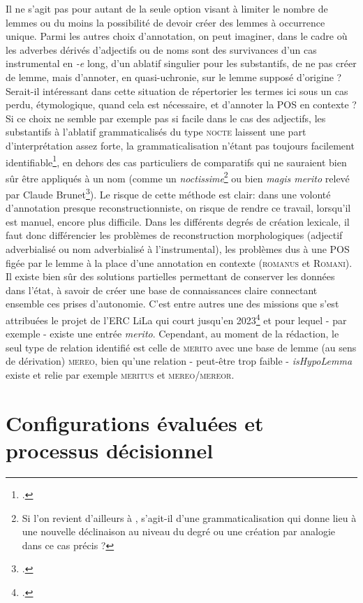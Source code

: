 Il ne s'agit pas pour autant de la seule option visant à limiter le nombre de lemmes ou du moins la possibilité de devoir créer des lemmes à occurrence unique. Parmi les autres choix d'annotation, on peut imaginer, dans le cadre où les adverbes dérivés d'adjectifs ou de noms sont des survivances d'un cas instrumental en \textit{-e} long, d'un ablatif singulier pour les substantifs, de ne pas créer de lemme, mais d'annoter, en quasi-uchronie, sur le lemme supposé d'origine ? Serait-il intéressant dans cette situation de répertorier les termes ici sous un cas perdu, étymologique, quand cela est nécessaire, et d'annoter la POS en contexte ? Si ce choix ne semble par exemple pas si facile dans le cas des adjectifs, les substantifs à l'ablatif grammaticalisés du type \textsc{nocte} laissent une part d'interprétation assez forte, la grammaticalisation n'étant pas toujours facilement identifiable\footcite{fruyt_adverbes_2008}, en dehors des cas particuliers de comparatifs qui ne sauraient bien sûr être appliqués à un nom (comme un \textit{noctissime}\footnote{Si l'on revient d'ailleurs à \cite{meillet_levolution_1922}, s'agit-il d'une grammaticalisation qui donne lieu à une nouvelle déclinaison au niveau du degré ou une création par analogie dans ce cas précis ?} ou bien \textit{magis merito} relevé par Claude Brunet\footcite{brunet_merito_2008}). Le risque de cette méthode est clair: dans une volonté d'annotation presque reconstructionniste, on risque de rendre ce travail, lorsqu'il est manuel, encore plus difficile. Dans les différents degrés de création lexicale, il faut donc différencier les problèmes de reconstruction morphologiques (adjectif adverbialisé ou nom adverbialisé à l'instrumental), les problèmes dus à une POS figée par le lemme à la place d'une annotation en contexte (\textsc{romanus} et \textsc{Romani}). Il existe bien sûr des solutions partielles permettant de conserver les données dans l'état, à savoir de créer une base de connaissances claire connectant ensemble ces prises d'autonomie. C'est entre autres une des missions que s'est attribuées le projet de l'ERC LiLa qui court jusqu'en 2023\footcite{passarotti_interlinking_2020} et pour lequel - par exemple - existe une entrée \textit{merito}. Cependant, au moment de la rédaction, le seul type de relation identifié est celle de \textsc{merito} avec une base de lemme (au sens de dérivation) \textsc{mereo}, bien qu'une relation - peut-être trop faible - \textit{isHypoLemma} existe et relie par exemple \textsc{meritus} et \textsc{mereo/mereor}.

\section{Configurations évaluées et processus décisionnel}


